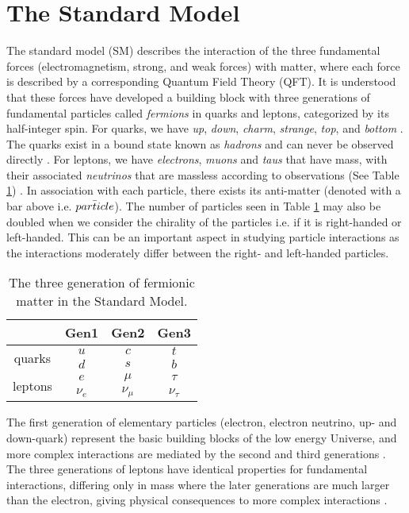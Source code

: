 
\section{The Standard Model}
The standard model (SM) describes the interaction of the three fundamental forces (electromagnetism, strong, and weak forces) with matter, where each force is described by a corresponding Quantum Field Theory (QFT). It is understood that these forces have developed a building block with three generations of fundamental particles called \textit{fermions} in quarks and leptons, categorized by its half-integer spin. For quarks, we have \textit{up}, \textit{down}, \textit{charm}, \textit{strange}, \textit{top}, and \textit{bottom} \cite{griffiths2008introduction}. The quarks exist in a bound state known as \textit{hadrons} and can never be observed directly \cite{thomson2013modern}. For leptons, we have \textit{electrons}, \textit{muons} and \textit{taus} that have mass, with their associated \textit{neutrinos} that are massless according to observations  (See Table \ref{tab:SMFerm}) \cite{griffiths2008introduction}. In association with each particle, there exists its anti-matter (denoted with a bar above i.e. $\Bar{particle}$).  The number of particles seen in Table \ref{tab:SMFerm} may also be doubled when we consider the chirality of the particles i.e. if it is right-handed or left-handed. This can be an important aspect in studying particle interactions as the interactions moderately differ between the right- and left-handed particles. \\

\begin{table}[htbp]
    \centering
    \begin{tabular}{||c|c|c|c||}
    \hline
    & Gen1 & Gen2 & Gen3 \\
    \hline
    \multirow{2}{1.2cm}{quarks} & $u$ & $c$ & $t$ \\
     & $d$ & $s$ & $b$ \\
    \hline
    \multirow{2}{1.2cm}{leptons} & $e$ & $\mu$ & $\tau$ \\
     & $\nu_e$ & $\nu_\mu$ & $\nu_\tau$ \\
    \hline
    \end{tabular}
    \caption{The three generation of fermionic matter in the Standard Model.}
    \label{tab:SMFerm}
\end{table}

The first generation of elementary particles (electron, electron neutrino, up- and down-quark) represent the basic building blocks of the low energy Universe, and more complex interactions are mediated by the second and third generations \cite{thomson2013modern}. The three generations of leptons have identical properties for fundamental interactions, differing only in mass where the later generations are much larger than the electron, giving physical consequences to more complex interactions \cite{thomson2013modern}. \\

